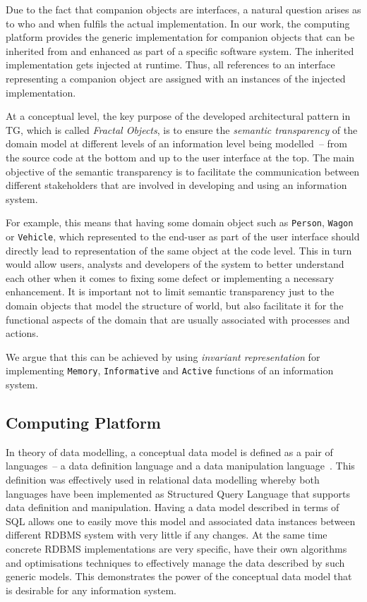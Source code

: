 \documentclass[a4paper,12pt,oneside,openright,final]{memoir} %
\begin{document}
  Due to the fact that companion objects are interfaces, a natural question arises as to who and when fulfils the actual implementation.
  In our work, the computing platform provides the generic implementation for companion objects that can be inherited from and enhanced as part of a specific software system.
  The inherited implementation gets injected at runtime.
  Thus, all references to an interface representing a companion object are assigned with an instances of the injected implementation.

	
	 

	At a conceptual level, the key purpose of the developed architectural pattern in TG, which is called \emph{Fractal Objects}, is to ensure the \emph{semantic transparency} of the domain model at different levels of an information level being modelled~-- from the source code at the bottom and up to the user interface at the top.
  	The main objective of the semantic transparency is to facilitate the communication between different stakeholders that are involved in developing and using an information system.

  	For example, this means that having some domain object such as \texttt{Person}, \texttt{Wagon} or \texttt{Vehicle}, which represented to the end-user as part of the user interface should directly lead to representation of the same object at the code level.
  	This in turn would allow users, analysts and developers of the system to better understand each other when it comes to fixing some defect or implementing a necessary enhancement.
  	It is important not to limit semantic transparency just to the domain objects that model the structure of world, but also facilitate it for the functional aspects of the domain that are usually associated with processes and actions.
  
	We argue that this can be achieved by using \emph{invariant representation} for implementing \texttt{Memory}, \texttt{Informative} and \texttt{Active} functions of an information system.
  
\subsection*{Computing Platform}

	In theory of data modelling, a conceptual data model is defined as a pair of languages~-- a data definition language and a data manipulation language~\cite{kal1983}.
  	This definition was effectively used in relational data modelling whereby both languages have been implemented as Structured Query Language that supports data definition and manipulation.
  	Having a data model described in terms of SQL allows one to easily move this model and associated data instances between different RDBMS system with very little if any changes.
  	At the same time concrete RDBMS implementations are very specific, have their own algorithms and optimisations techniques to effectively manage the data described by such generic models.
  	This demonstrates the power of the conceptual data model that is desirable for any information system.
  
\end{document}
